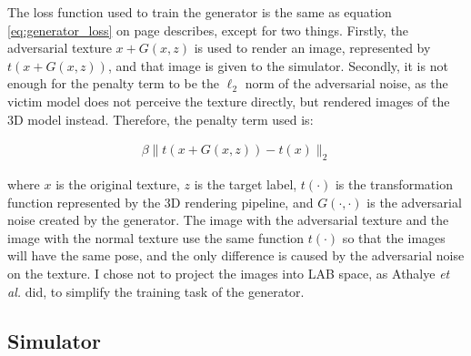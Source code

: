 The loss function used to train the generator is the same as equation \ref{eq:generator_loss} on page \pageref{eq:generator_loss} describes, except for two things. Firstly, the adversarial texture $x + G(x, z)$ is used to render an image, represented by $t(x + G(x,z))$, and that image is given to the simulator. Secondly, it is not enough for the penalty term to be the $\ell_2$ norm of the adversarial noise, as the victim model does not perceive the texture directly, but rendered images of the 3D model instead. Therefore, the penalty term used is:

\begin{equation}
    \label{eq:g-eot-l2-loss}
    \begin{aligned}
    \beta\|t(x + G(x,z)) - t(x)\|_2
    \end{aligned}
\end{equation}

\noindent where $x$ is the original texture, $z$ is the target label, $t(\cdot)$ is the transformation function represented by the 3D rendering pipeline, and $G(\cdot, \cdot)$ is the adversarial noise created by the generator. The image with the adversarial texture and the image with the normal texture use the same function $t(\cdot)$ so that the images will have the same pose, and the only difference is caused by the adversarial noise on the texture. I chose not to project the images into LAB space, as Athalye \textit{et al.} did, to simplify the training task of the generator.

\subsection{Simulator}

